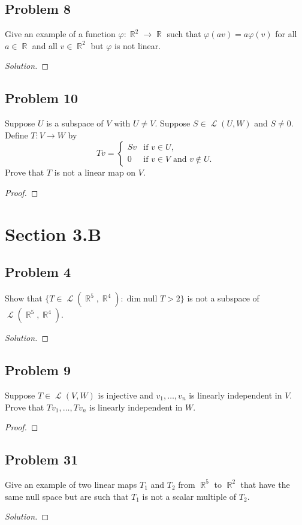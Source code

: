 \documentclass[letterpaper, 12pt]{amsart}
\DeclareMathOperator{\R}{\mathbb{R}}
\renewcommand{\null}{\text{null }}
\DeclareMathOperator{\Ell}{\mathscr{L}}
\theoremstyle{definition}  %
\begin{document}
		\subsection*{Problem 8}
		Give an example of a function $\varphi : \R^{2} \to \R$ such that $\varphi(av) = a\varphi(v)$ for all $a \in \R$ and all $v \in \R^{2}$ but $\varphi$ is not linear.

		\begin{proof}[Solution]
		\end{proof}

		\subsection*{Problem 10}
		Suppose $U$ is a subspace of $V$ with $U \neq V$.
		Suppose $S \in \Ell(U,W)$ and $S \neq 0$.
		Define $T : V \to W$ by $$Tv = \begin{cases} Sv & \text{if $v \in U$}, \\ 0 & \text{if $v \in V$ and $v \notin U$}. \end{cases}$$
		Prove that $T$ is not a linear map on $V$.

		\begin{proof}
		\end{proof}

	\section*{Section 3.B}
		\subsection*{Problem 4}
		Show that $\{ T \in \Ell(\R^{5}, \R^{4}) : \dim \null T > 2 \}$ is not a subspace of $\Ell(\R^{5}, \R^{4})$.

		\begin{proof}[Solution]
		\end{proof}

		\subsection*{Problem 9}
		Suppose $T \in \Ell(V,W)$ is injective and $v_{1}, \dots, v_{n}$ is linearly independent in $V$.
		Prove that $Tv_{1}, \dots, Tv_{n}$ is linearly independent in $W$.

		\begin{proof}
		\end{proof}

		\subsection*{Problem 31}
		Give an example of two linear maps $T_{1}$ and $T_{2}$ from $\R^{5}$ to $\R^{2}$ that have the same null space but are such that $T_{1}$ is not a scalar multiple of $T_{2}$.

		\begin{proof}[Solution]
		\end{proof}
\end{document}
